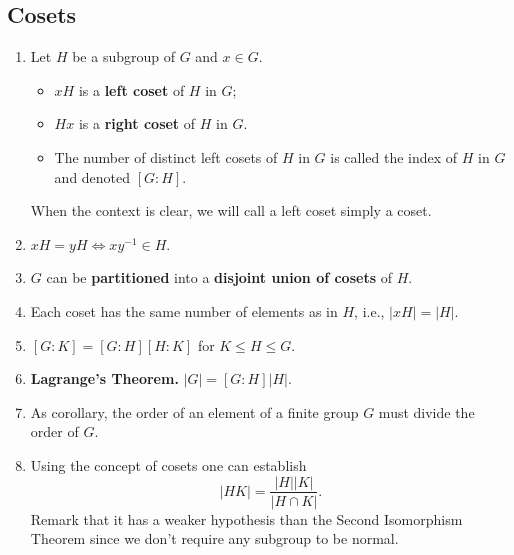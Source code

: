 \subsection*{Cosets}
\begin{enumerate}[(1)]
	\item Let $H$ be a subgroup of $G$ and $x\in G$. 
	\begin{itemize}
		\item $xH$ is a \textbf{left coset} of $H$ in $G$;
		\item $Hx$ is a \textbf{right coset} of $H$ in $G$.
		\item The number of distinct left cosets of $H$ in $G$ is called the index of $H$ in $G$ and denoted $[G:H]$.
	\end{itemize}
	When the context is clear, we will call a left coset simply a coset.
	\item $xH = yH\Leftrightarrow xy^{-1}\in H$.
	\item $G$ can be \textbf{partitioned} into a \textbf{disjoint union of cosets} of $H$.
	\item Each coset has the same number of elements as in $H$, i.e., $|xH| = |H|$.
	\item $[G:K] = [G:H][H:K]$ for $K\leq H\leq G$.
	\item \textbf{Lagrange's Theorem.} $|G| = [G:H]|H|$.
	\item As corollary, the order of an element of a finite group $G$ must divide the order of $G$.
	\item Using the concept of cosets one can establish 
	\begin{equation*}
		|HK| = \frac{|H||K|}{|H\cap K|}.
	\end{equation*}
	Remark that it has a weaker hypothesis than the Second Isomorphism Theorem since we don't require any subgroup to be normal.
\end{enumerate}